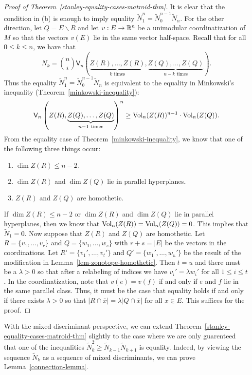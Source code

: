 \documentclass{puthesis-UG}
\begin{document}
\begin{proof}[Proof of Theorem~\ref{stanley-equality-cases-matroid-thm}]
	It is clear that the condition in (b) is enough to imply equality $\widetilde{N}_1^n = \widetilde{N}_0^{n-1} \widetilde{N}_n$. For the other direction, let $Q = E \backslash R$ and let $v : E \to \mathbb{R}^n$ be a unimodular coordinatization of $M$ so that the vectors $v(E)$ lie in the same vector half-space. Recall that for all $0 \leq k \leq n$, we have that 
	\[
		N_k = \binom{n}{i} \mathsf{V}_n \left ( \underbrace{Z(R), \ldots, Z(R)}_{k \text{ times}}, \underbrace{Z(Q), \ldots, Z(Q)}_{n-k \text{ times}} \right ). 
	\]
	Thus the equality $\widetilde{N}_1^n = \widetilde{N}_0^{n-1} \widetilde{N}_n$ is equivalent to the equality in Minkowski's inequality (Theorem~\ref{minkowski-inequality}):
	\[
		\mathsf{V}_n \left ( Z(R), \underbrace{Z(Q), \ldots, Z(Q)}_{n-1 \text{ times}} \right )^n \geq \operatorname{Vol}_n (Z(R))^{n-1} \cdot \operatorname{Vol}_n(Z(Q)).
	\]
	From the equality case of Theorem~\ref{minkowski-inequality}, we know that one of the following three things occur:
	\begin{enumerate}[label = (\arabic*)]
		\item $\dim Z(R) \leq n-2$. 
		\item $\dim Z(R)$ and $\dim Z(Q)$ lie in parallel hyperplanes. 
		\item $Z(R)$ and $Z(Q)$ are homothetic. 
	\end{enumerate}
	If $\dim Z(R) \leq n-2$ or $\dim Z(R)$ and $\dim Z(Q)$ lie in parallel hyperplanes, then we know that $\operatorname{Vol}_n (Z(R)) = \operatorname{Vol}_n(Z(Q)) = 0$. This implies that $\widetilde{N}_1 = 0$. Now suppose that $Z(R)$ and $Z(Q)$ are homothetic. Let $R = \{v_1, \ldots, v_r\}$ and $Q = \{w_1, \ldots, w_s\}$ with $r + s = |E|$ be the vectors in the coordinations. Let $R' = \{v_1', \ldots, v_t'\}$ and $Q' =\{w_1', \ldots, w_u'\}$ be the result of the modification in Lemma~\ref{lem-zonotope-homothetic}. Then $t = u$ and there must be a $\lambda > 0$ so that after a relabeling of indices we have $v_i' = \lambda w_i'$ for all $1 \leq i \leq t$. In the coordinatization, note that $v(e) = v(f)$ if and only if $e$ and $f$ lie in the same parallel class. Thus, it must be the case that equality holds if and only if there exists $\lambda > 0$ so that $|R \cap \overline{x}| = \lambda |Q \cap \overline{x}|$ for all $x \in E$. This suffices for the proof. 
\end{proof}

With the mixed discriminant perspective, we can extend Theorem~\ref{stanley-equality-cases-matroid-thm} slightly to the case where we are only guarenteed that one of the inequalities $\widetilde{N}_k^2 \geq \widetilde{N}_{k-1} \widetilde{N}_{k+1}$ is equality. Indeed, by viewing the sequence $\widetilde{N}_k$ as a sequence of mixed discriminants, we can prove Lemma~\ref{connection-lemma}. 
\end{document}

